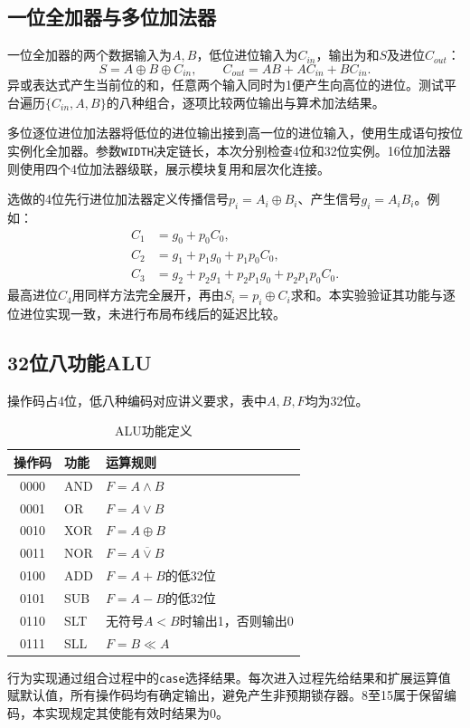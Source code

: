 \documentclass[12pt,a4paper]{ctexart}
\begin{document}
\subsection{一位全加器与多位加法器}
一位全加器的两个数据输入为$A,B$，低位进位输入为$C_{in}$，输出为和$S$及进位$C_{out}$：
\begin{equation}
S=A\oplus B\oplus C_{in},\qquad
C_{out}=AB+AC_{in}+BC_{in}.
\end{equation}
异或表达式产生当前位的和，任意两个输入同时为1便产生向高位的进位。测试平台遍历$\{C_{in},A,B\}$的八种组合，逐项比较两位输出与算术加法结果。

多位逐位进位加法器将低位的进位输出接到高一位的进位输入，使用生成语句按位实例化全加器。参数\texttt{WIDTH}决定链长，本次分别检查4位和32位实例。16位加法器则使用四个4位加法器级联，展示模块复用和层次化连接。

选做的4位先行进位加法器定义传播信号$p_i=A_i\oplus B_i$、产生信号$g_i=A_iB_i$。例如：
\begin{align}
C_1&=g_0+p_0C_0,\\
C_2&=g_1+p_1g_0+p_1p_0C_0,\\
C_3&=g_2+p_2g_1+p_2p_1g_0+p_2p_1p_0C_0.
\end{align}
最高进位$C_4$用同样方法完全展开，再由$S_i=p_i\oplus C_i$求和。本实验验证其功能与逐位进位实现一致，未进行布局布线后的延迟比较。

\subsection{32位八功能ALU}
操作码占4位，低八种编码对应讲义要求，表中$A,B,F$均为32位。
\begin{table}[H]
\centering
\caption{ALU功能定义}
\begin{tabular}{cll}
\toprule
操作码 & 功能 & 运算规则\\
\midrule
0000 & AND & $F=A\land B$\\
0001 & OR & $F=A\lor B$\\
0010 & XOR & $F=A\oplus B$\\
0011 & NOR & $F=\overline{A\lor B}$\\
0100 & ADD & $F=A+B$的低32位\\
0101 & SUB & $F=A-B$的低32位\\
0110 & SLT & 无符号$A<B$时输出1，否则输出0\\
0111 & SLL & $F=B\ll A$\\
\bottomrule
\end{tabular}
\end{table}
行为实现通过组合过程中的\texttt{case}选择结果。每次进入过程先给结果和扩展运算值赋默认值，所有操作码均有确定输出，避免产生非预期锁存器。8至15属于保留编码，本实现规定其使能有效时结果为0。
\end{document}
